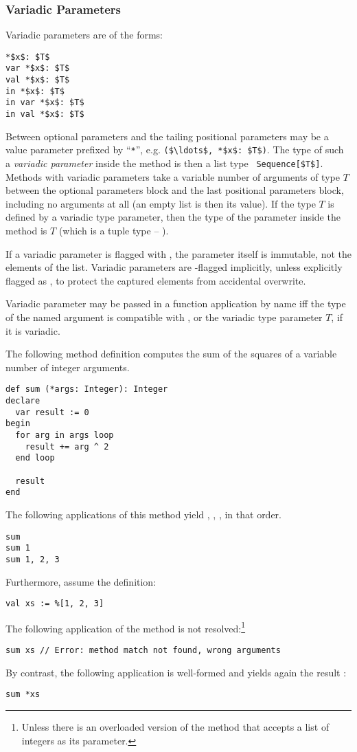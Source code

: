 \subsubsection{Variadic Parameters}
\label{sec:variadic-parameters}

Variadic parameters are of the forms:
\begin{lstlisting}
*$x$: $T$
var *$x$: $T$
val *$x$: $T$
in *$x$: $T$
in var *$x$: $T$
in val *$x$: $T$
\end{lstlisting}

Between optional parameters and the tailing positional parameters may be a value parameter prefixed by ``\lstinline!*!'', e.g. \lstinline!($\ldots$, *$x$: $T$)!. The type of such a {\em variadic parameter} inside the method is then a list type ~\lstinline!Sequence[$T$]!. Methods with variadic parameters take a variable number of arguments of type $T$ between the optional parameters block and the last positional parameters block, including no arguments at all (an empty list is then its value). If the type $T$ is defined by a variadic type parameter, then the type of the parameter inside the method is $T$ (which is a tuple type -- ). 

If a variadic parameter is flagged with , the parameter itself is immutable, not the elements of the list. Variadic parameters are -flagged implicitly, unless explicitly flagged as , to protect the captured elements from accidental overwrite. 

Variadic parameter may be passed in a function application by name iff the type of the named argument is compatible with , or the variadic type parameter $T$, if it is variadic. 

\example The following method definition computes the sum of the squares of a variable number of integer arguments.
\begin{lstlisting}
def sum (*args: Integer): Integer
declare
  var result := 0
begin
  for arg in args loop
    result += arg ^ 2
  end loop
  
  result
end
\end{lstlisting}
The following applications of this method yield , , , in that order.
\begin{lstlisting}
sum
sum 1
sum 1, 2, 3
\end{lstlisting}
Furthermore, assume the definition:
\begin{lstlisting}
val xs := %[1, 2, 3]
\end{lstlisting}
The following application of the method  is not resolved:\footnote{Unless there is an overloaded version of the method that accepts a list of integers as its parameter.}
\begin{lstlisting}
sum xs // Error: method match not found, wrong arguments
\end{lstlisting}
By contrast, the following application is well-formed and yields again the result :
\begin{lstlisting}
sum *xs
\end{lstlisting}






